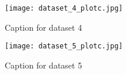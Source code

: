 \begin{figure}[h!]
    \centering
    \texttt{[image: dataset\_4\_plotc.jpg]}
    \caption{Caption for dataset 4}
\end{figure}

\begin{figure}[h!]
    \centering
    \texttt{[image: dataset\_5\_plotc.jpg]}
    \caption{Caption for dataset 5}
\end{figure}










